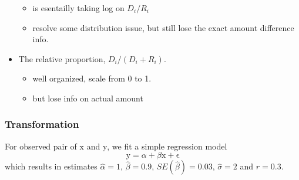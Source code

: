 \documentclass[]{article}
\providecommand{\tightlist}{%
  \setlength{\itemsep}{0pt}\setlength{\parskip}{0pt}}
\begin{document}
\begin{itemize}
  \begin{itemize}
  \tightlist
  \item
    is esentailly taking log on \(D_i/R_i\)
  \item
    resolve some distribution issue, but still lose the exact amount
    difference info.
  \end{itemize}
\item
  The relative proportion, \(D_i/(D_i+R_i)\).

  \begin{itemize}
  \tightlist
  \item
    well organized, scale from 0 to 1.
  \item
    but lose info on actual amount
  \end{itemize}
\end{itemize}

\hypertarget{transformation}{%
\subsubsection{Transformation}\label{transformation}}

For observed pair of \(\mathrm{x}\) and \(\mathrm{y}\), we fit a simple
regression model
\[\mathrm{y}=\alpha + \beta \mathrm{x} + \mathrm{\epsilon}\] which
results in estimates \(\hat{\alpha}=1\), \(\hat{\beta}=0.9\),
\(SE(\hat{\beta})=0.03\), \(\hat{\sigma}=2\) and \(r=0.3\).
\end{document}
